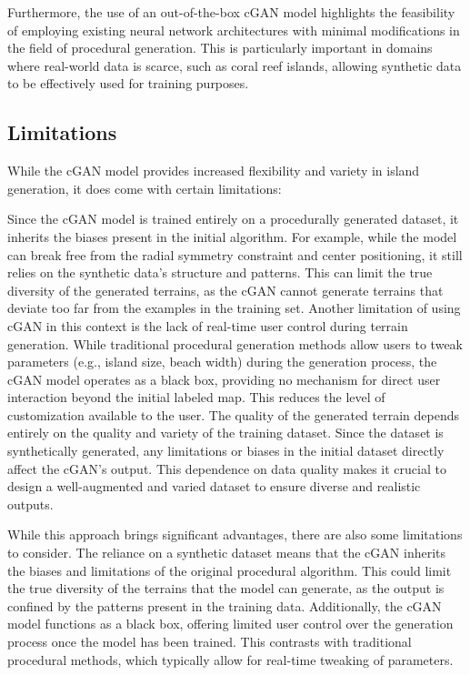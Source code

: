 Furthermore, the use of an out-of-the-box cGAN model highlights the feasibility of employing existing neural network architectures with minimal modifications in the field of procedural generation. This is particularly important in domains where real-world data is scarce, such as coral reef islands, allowing synthetic data to be effectively used for training purposes.


\subsection{Limitations}

While the cGAN model provides increased flexibility and variety in island generation, it does come with certain limitations:

\begin{Itemize}
     Since the cGAN model is trained entirely on a procedurally generated dataset, it inherits the biases present in the initial algorithm. For example, while the model can break free from the radial symmetry constraint and center positioning, it still relies on the synthetic data's structure and patterns. This can limit the true diversity of the generated terrains, as the cGAN cannot generate terrains that deviate too far from the examples in the training set.
     Another limitation of using cGAN in this context is the lack of real-time user control during terrain generation. While traditional procedural generation methods allow users to tweak parameters (e.g., island size, beach width) during the generation process, the cGAN model operates as a black box, providing no mechanism for direct user interaction beyond the initial labeled map. This reduces the level of customization available to the user.
     The quality of the generated terrain depends entirely on the quality and variety of the training dataset. Since the dataset is synthetically generated, any limitations or biases in the initial dataset directly affect the cGAN's output. This dependence on data quality makes it crucial to design a well-augmented and varied dataset to ensure diverse and realistic outputs.
\end{Itemize}

While this approach brings significant advantages, there are also some limitations to consider. The reliance on a synthetic dataset means that the cGAN inherits the biases and limitations of the original procedural algorithm. This could limit the true diversity of the terrains that the model can generate, as the output is confined by the patterns present in the training data. Additionally, the cGAN model functions as a black box, offering limited user control over the generation process once the model has been trained. This contrasts with traditional procedural methods, which typically allow for real-time tweaking of parameters.


